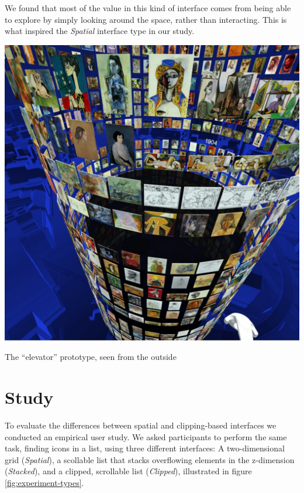 \documentclass{tufte-book} %
\begin{document}
We found that most of the value in this kind of interface comes from being able to explore by simply looking around the space, rather than interacting. This is what inspired the \emph{Spatial} interface type in our study.

\begin{marginfigure}
  \includegraphics[width=\linewidth]{picassooutside.jpg}
  \caption{The ``elevator'' prototype, seen from the outside}
  \label{fig:picassooutside}
\end{marginfigure}



\chapter{Study}
\label{ch:study}

To evaluate the differences between spatial and clipping-based interfaces we conducted an empirical user study. We asked participants to perform the same task, finding icons in a list, using three different interfaces: A two-dimensional grid (\emph{Spatial}), a scollable list that stacks overflowing elements in the z-dimension (\emph{Stacked}), and a clipped, scrollable list (\emph{Clipped}), illustrated in figure \ref{fig:experiment-types}.
\end{document}
